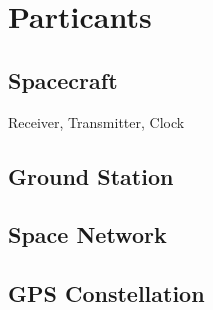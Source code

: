 

\section{Particants}


\subsection{Spacecraft}

Receiver, Transmitter, Clock

\subsection{Ground Station}

\subsection{Space Network}

\subsection{GPS Constellation}
